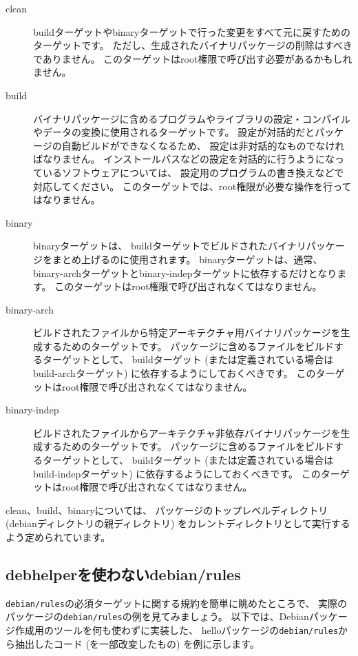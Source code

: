 \documentclass[mingoth,a4paper]{jsarticle}
\begin{document}
\begin{description}
 \item[clean]
    buildターゲットやbinaryターゲットで行った変更をすべて元に戻すためのターゲットです。
    ただし、生成されたバイナリパッケージの削除はすべきでありません。
    このターゲットはroot権限で呼び出す必要があるかもしれません。
 \item[build]
    バイナリパッケージに含めるプログラムやライブラリの設定・コンパイルやデータの変換に使用されるターゲットです。
    設定が対話的だとパッケージの自動ビルドができなくなるため、
    設定は非対話的なものでなければなりません。
    インストールパスなどの設定を対話的に行うようになっているソフトウェアについては、
    設定用のプログラムの書き換えなどで対応してください。
    このターゲットでは、root権限が必要な操作を行ってはなりません。
 \item[binary]
    binaryターゲットは、
    buildターゲットでビルドされたバイナリパッケージをまとめ上げるのに使用されます。
    binaryターゲットは、通常、
    binary-archターゲットとbinary-indepターゲットに依存するだけとなります。
    このターゲットはroot権限で呼び出されなくてはなりません。
 \item[binary-arch]
    ビルドされたファイルから特定アーキテクチャ用バイナリパッケージを生成するためのターゲットです。
    パッケージに含めるファイルをビルドするターゲットとして、
    buildターゲット (または定義されている場合はbuild-archターゲット) に依存するようにしておくべきです。
    このターゲットはroot権限で呼び出されなくてはなりません。
 \item[binary-indep]
    ビルドされたファイルからアーキテクチャ非依存バイナリパッケージを生成するためのターゲットです。
    パッケージに含めるファイルをビルドするターゲットとして、
    buildターゲット (または定義されている場合はbuild-indepターゲット) に依存するようにしておくべきです。
    このターゲットはroot権限で呼び出されなくてはなりません。
\end{description}

clean、build、binaryについては、
パッケージのトップレベルディレクトリ (debianディレクトリの親ディレクトリ) をカレントディレクトリとして実行するよう定められています。

\subsection{debhelperを使わないdebian/rules}

\texttt{debian/rules}の必須ターゲットに関する規約を簡単に眺めたところで、
実際のパッケージの\texttt{debian/rules}の例を見てみましょう。
以下では、Debianパッケージ作成用のツールを何も使わずに実装した、
helloパッケージの\texttt{debian/rules}から抽出したコード (を一部改変したもの) を例に示します。
\end{document}
